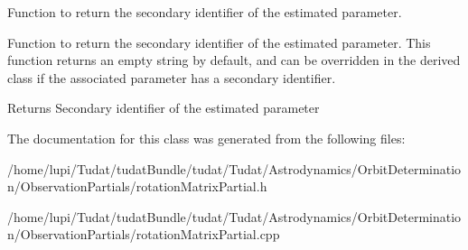 Function to return the secondary identifier of the estimated parameter. 

Function to return the secondary identifier of the estimated parameter. This function returns an empty string by default, and can be overridden in the derived class if the associated parameter has a secondary identifier. \begin{DoxyReturn}{Returns}
Secondary identifier of the estimated parameter 
\end{DoxyReturn}


The documentation for this class was generated from the following files\+:\begin{DoxyCompactItemize}
\item 
/home/lupi/\+Tudat/tudat\+Bundle/tudat/\+Tudat/\+Astrodynamics/\+Orbit\+Determination/\+Observation\+Partials/rotation\+Matrix\+Partial.\+h\item 
/home/lupi/\+Tudat/tudat\+Bundle/tudat/\+Tudat/\+Astrodynamics/\+Orbit\+Determination/\+Observation\+Partials/rotation\+Matrix\+Partial.\+cpp\end{DoxyCompactItemize}
